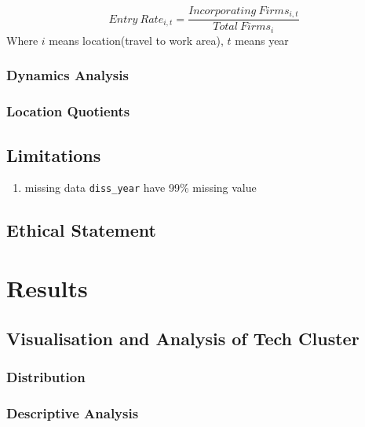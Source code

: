 \documentclass[
  12pt,
  oneside]{book}
\providecommand{\tightlist}{%
  \setlength{\itemsep}{0pt}\setlength{\parskip}{0pt}}
\begin{document}
\[ Entry\ Rate_{i,t} = \frac{Incorporating\ Firms_{i,t}}{Total\  Firms_{i}} \]
Where \(i\) means location(travel to work area), \(t\) means year

\hypertarget{dynamics-analysis}{%
\subsection{Dynamics Analysis}\label{dynamics-analysis}}

\hypertarget{location-quotients}{%
\subsection{Location Quotients}\label{location-quotients}}

\hypertarget{limitations}{%
\section{Limitations}\label{limitations}}

\begin{enumerate}
\def\labelenumi{\arabic{enumi}.}
\tightlist
\item
  missing data
  \texttt{diss\_year} have 99\% missing value
\end{enumerate}

\hypertarget{ethical-statement}{%
\section{Ethical Statement}\label{ethical-statement}}

\hypertarget{results}{%
\chapter{Results}\label{results}}

\hypertarget{visualisation-and-analysis-of-tech-cluster}{%
\section{Visualisation and Analysis of Tech Cluster}\label{visualisation-and-analysis-of-tech-cluster}}

\hypertarget{distribution}{%
\subsection{Distribution}\label{distribution}}

\hypertarget{descriptive-analysis}{%
\subsection{Descriptive Analysis}\label{descriptive-analysis}}
\end{document}
